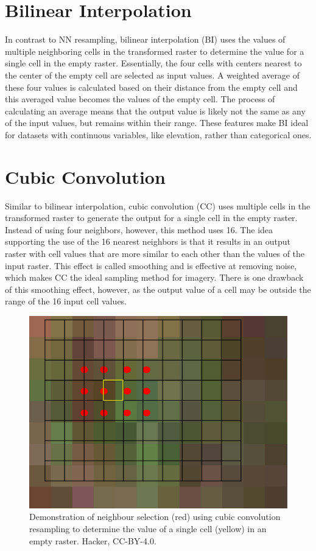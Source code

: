 \documentclass[
]{book}
\begin{document}
\hypertarget{bilinear-interpolation}{%
\section{Bilinear Interpolation}\label{bilinear-interpolation}}

In contrast to NN resampling, bilinear interpolation (BI) uses the
values of multiple neighboring cells in the transformed raster to
determine the value for a single cell in the empty raster. Essentially,
the four cells with centers nearest to the center of the empty cell are
selected as input values. A weighted average of these four values is
calculated based on their distance from the empty cell and this averaged
value becomes the values of the empty cell. The process of calculating
an average means that the output value is likely not the same as any of
the input values, but remains within their range. These features make BI
ideal for datasets with continuous variables, like elevation, rather
than categorical ones.

\hypertarget{cubic-convolution}{%
\section{Cubic Convolution}\label{cubic-convolution}}

Similar to bilinear interpolation, cubic convolution (CC) uses multiple
cells in the transformed raster to generate the output for a single cell
in the empty raster. Instead of using four neighbors, however, this
method uses 16. The idea supporting the use of the 16 nearest neighbors
is that it results in an output raster with cell values that are more
similar to each other than the values of the input raster. This effect
is called smoothing and is effective at removing noise, which makes CC
the ideal sampling method for imagery. There is one drawback of this
smoothing effect, however, as the output value of a cell may be outside
the range of the 16 input cell values.

\begin{figure}
\includegraphics[width=0.75\linewidth,height=0.75\textheight]{images/13-cubic_convolution} \caption{Demonstration of neighbour selection (red) using cubic convolution resampling to determine the value of a single cell (yellow) in an empty raster. Hacker, CC-BY-4.0.}\label{fig:13-cubic}
\end{figure}
\end{document}
